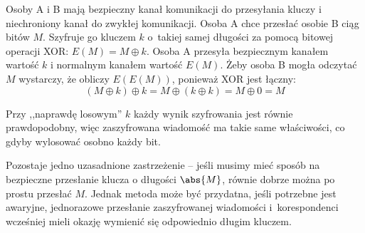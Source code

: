 Osoby A i B mają bezpieczny kanał komunikacji do przesyłania kluczy i niechroniony kanał do zwykłej komunikacji. Osoba A chce przesłać osobie B ciąg bitów \( M \).
Szyfruje go kluczem \( k \) o~takiej samej długości za pomocą bitowej operacji XOR: \( E(M) = M \oplus k \).
Osoba A przesyła bezpiecznym kanałem wartość \( k \) i normalnym kanałem wartość \( E(M) \). Żeby osoba B mogła odczytać \( M \) wystarczy, że obliczy \( E(E(M)) \), ponieważ XOR jest łączny:
\[
    (M \oplus k) \oplus k = M \oplus (k \oplus k)  = M \oplus 0 = M
\]

Przy ,,naprawdę losowym'' \( k \) każdy wynik szyfrowania jest równie prawdopodobny, więc zaszyfrowana wiadomość ma takie same właściwości, co gdyby wylosować osobno każdy bit.

Pozostaje jedno uzasadnione zastrzeżenie -- jeśli musimy mieć sposób na bezpieczne przesłanie klucza o długości \( \abs{M} \), równie dobrze można po prostu przesłać \( M \).
Jednak metoda może być przydatna, jeśli potrzebne jest awaryjne, jednorazowe przesłanie zaszyfrowanej wiadomości i~korespondenci wcześniej mieli okazję wymienić się odpowiednio długim kluczem.